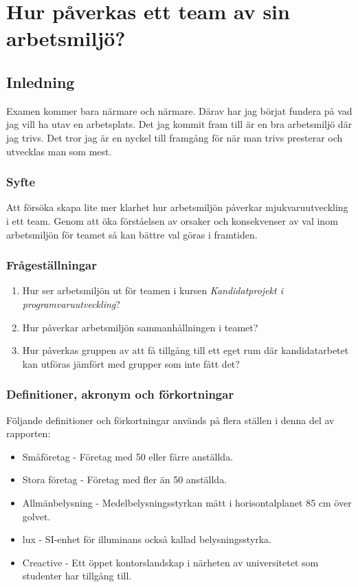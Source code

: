 \chapter{Hur påverkas ett team av sin arbetsmiljö?}
\label{cha:indiv-report-hampus}

\section{Inledning}
\label{sec:introduction-hampus}

Examen kommer bara närmare och närmare. Därav har jag börjat fundera på vad jag vill ha utav en arbetsplats. Det jag kommit fram till är en bra arbetsmiljö där jag trivs. Det tror jag är en nyckel till framgång för när man trivs presterar och utvecklas man som mest. 

\subsection{Syfte}
\label{sec:purpose-hampus}

Att försöka skapa lite mer klarhet hur  arbetsmiljön påverkar mjukvaruutveckling i ett team. Genom att öka förståelsen av orsaker och konsekvenser av val inom arbetsmiljön för teamet så kan bättre val göras i framtiden.

\subsection{Frågeställningar}
\label{sec:issue-hampus}

\begin{enumerate}
\item Hur ser arbetsmiljön ut för teamen i kursen \textit{Kandidatprojekt i programvaruutveckling}?
\item Hur påverkar arbetsmiljön sammanhållningen i teamet?
\item Hur påverkas gruppen av att få tillgång till ett eget rum där kandidatarbetet kan utföras jämfört med grupper som inte fått det?
\end{enumerate}

\subsection{Definitioner, akronym och förkortningar}
Följande definitioner och förkortningar används på flera ställen i denna del av rapporten:

\begin{itemize}
\item Småföretag - Företag med 50 eller färre anställda.
\item Stora företag - Företag med fler än 50 anställda.
\item Allmänbelysning - Medelbelysningsstyrkan mätt i horisontalplanet 85 cm över golvet.
\item lux - SI-enhet för illuminans också kallad belysningsstyrka.
\item Creactive - Ett öppet kontorslandskap i närheten av universitetet som studenter har tillgång till.
\end{itemize}

